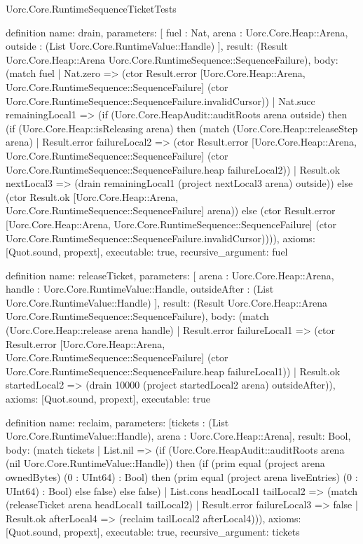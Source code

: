 \begin{lexlean}{Uorc.Core.RuntimeSequenceTicketTests}
\begin{semanticmodule}
definition{
  name: drain,
  parameters: [
    fuel : Nat,
    arena : Uorc.Core.Heap::Arena,
    outside : (List Uorc.Core.RuntimeValue::Handle)
  ],
  result: (Result Uorc.Core.Heap::Arena Uorc.Core.RuntimeSequence::SequenceFailure),
  body: (match fuel
    | Nat.zero => (ctor Result.error [Uorc.Core.Heap::Arena, Uorc.Core.RuntimeSequence::SequenceFailure] (ctor Uorc.Core.RuntimeSequence::SequenceFailure.invalidCursor))
    | Nat.succ remainingLocal1 => (if (Uorc.Core.HeapAudit::auditRoots arena outside) then (if (Uorc.Core.Heap::isReleasing arena) then (match (Uorc.Core.Heap::releaseStep arena)
      | Result.error failureLocal2 => (ctor Result.error [Uorc.Core.Heap::Arena, Uorc.Core.RuntimeSequence::SequenceFailure] (ctor Uorc.Core.RuntimeSequence::SequenceFailure.heap failureLocal2))
      | Result.ok nextLocal3 => (drain remainingLocal1 (project nextLocal3 arena) outside)) else (ctor Result.ok [Uorc.Core.Heap::Arena, Uorc.Core.RuntimeSequence::SequenceFailure] arena)) else (ctor Result.error [Uorc.Core.Heap::Arena, Uorc.Core.RuntimeSequence::SequenceFailure] (ctor Uorc.Core.RuntimeSequence::SequenceFailure.invalidCursor)))),
  axioms: [Quot.sound, propext],
  executable: true,
  recursive_argument: fuel
}

definition{
  name: releaseTicket,
  parameters: [
    arena : Uorc.Core.Heap::Arena,
    handle : Uorc.Core.RuntimeValue::Handle,
    outsideAfter : (List Uorc.Core.RuntimeValue::Handle)
  ],
  result: (Result Uorc.Core.Heap::Arena Uorc.Core.RuntimeSequence::SequenceFailure),
  body: (match (Uorc.Core.Heap::release arena handle)
    | Result.error failureLocal1 => (ctor Result.error [Uorc.Core.Heap::Arena, Uorc.Core.RuntimeSequence::SequenceFailure] (ctor Uorc.Core.RuntimeSequence::SequenceFailure.heap failureLocal1))
    | Result.ok startedLocal2 => (drain 10000 (project startedLocal2 arena) outsideAfter)),
  axioms: [Quot.sound, propext],
  executable: true
}

definition{
  name: reclaim,
  parameters: [tickets : (List Uorc.Core.RuntimeValue::Handle), arena : Uorc.Core.Heap::Arena],
  result: Bool,
  body: (match tickets
    | List.nil => (if (Uorc.Core.HeapAudit::auditRoots arena (nil Uorc.Core.RuntimeValue::Handle)) then (if (prim equal (project arena ownedBytes) (0 : UInt64) : Bool) then (prim equal (project arena liveEntries) (0 : UInt64) : Bool) else false) else false)
    | List.cons headLocal1 tailLocal2 => (match (releaseTicket arena headLocal1 tailLocal2)
      | Result.error failureLocal3 => false
      | Result.ok afterLocal4 => (reclaim tailLocal2 afterLocal4))),
  axioms: [Quot.sound, propext],
  executable: true,
  recursive_argument: tickets
}


\end{semanticmodule}
\end{lexlean}

